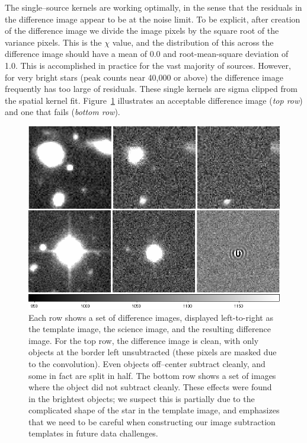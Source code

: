 The single--source kernels are working optimally, in the sense that
the residuals in the difference image appear to be at the noise limit.
To be explicit, after creation of the difference image we divide the
image pixels by the square root of the variance pixels.  This is the
$\chi$ value, and the distribution of this across the difference image
should have a mean of 0.0 and root-mean-square deviation of 1.0.
This is accomplished in practice for the vast majority of sources.
However, for very bright stars (peak counts near 40,000 or above) the
difference image frequently has too large of residuals.  These single
kernels are sigma clipped from the spatial kernel fit.
Figure~\ref{fig:diffim} illustrates an acceptable difference image
({\it top row}) and one that fails ({\it bottom row}).  

\begin{figure}[htp]
\centering
\includegraphics[width=6in]{images/diffim.png}
\caption[Example difference images.]
{ Each row shows a set of difference images, displayed left-to-right
as the template image, the science image, and the resulting difference
image.  For the top row, the difference image is clean, with only
objects at the border left unsubtracted (these pixels are masked due
to the convolution).  Even objects off--center subtract cleanly, and
some in fact are split in half.  The bottom row shows a set of images
where the object did not subtract cleanly.  These effects were found
in the brightest objects; we suspect this is partially due to the
complicated shape of the star in the template image, and emphasizes
that we need to be careful when constructing our image subtraction
templates in future data challenges.  }
\label{fig:diffim}
\end{figure}

